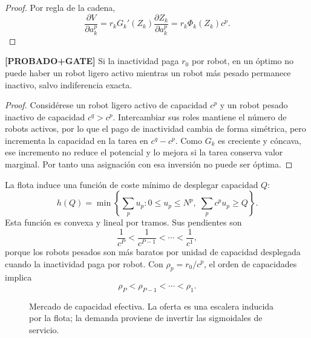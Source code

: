 \begin{proof}
Por regla de la cadena,
\[
  \frac{\partial V}{\partial a_k^p}
  =
  r_kG_k'(Z_k)\frac{\partial Z_k}{\partial a_k^p}
  =
  r_k\Phi_k(Z_k)c^p.
\]
\end{proof}

\begin{teorema} \textbf{[PROBADO+GATE]}
Si la inactividad paga $r_0$ por robot, en un óptimo no puede haber un robot ligero
activo mientras un robot más pesado permanece inactivo, salvo indiferencia exacta.
\end{teorema}

\begin{proof}
Considérese un robot ligero activo de capacidad $c^p$ y un robot pesado inactivo de
capacidad $c^q>c^p$. Intercambiar sus roles mantiene el número de robots activos, por lo
que el pago de inactividad cambia de forma simétrica, pero incrementa la capacidad en la
tarea en $c^q-c^p$. Como $G_k$ es creciente y cóncava, ese incremento no reduce el
potencial y lo mejora si la tarea conserva valor marginal. Por tanto una asignación con
esa inversión no puede ser óptima.
\end{proof}

La flota induce una función de coste mínimo de desplegar capacidad $Q$:
\[
  h(Q)=
  \min\left\{
    \sum_p u_p:
    0\le u_p\le N^p,\;
    \sum_pc^pu_p\ge Q
  \right\}.
\]
Esta función es convexa y lineal por tramos. Sus pendientes son
\[
  \frac{1}{c^P}<\frac{1}{c^{P-1}}<\cdots<\frac{1}{c^1},
\]
porque los robots pesados son más baratos por unidad de capacidad desplegada cuando la
inactividad paga por robot.
Con $\rho_p=r_0/c^p$, el orden de capacidades implica
\[
  \rho_P<\rho_{P-1}<\cdots<\rho_1.
\]

\begin{figure}[H]
\centering
{}
\caption{Mercado de capacidad efectiva. La oferta es una escalera inducida por la flota;
la demanda proviene de invertir las sigmoidales de servicio.}
\label{fig:marco_mercado}
\end{figure}

